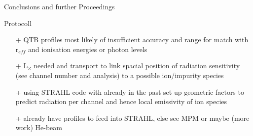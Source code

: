 \documentclass{beamer}
\begin{document}
    \begin{frame}{Conclusions and further Proceedings}
        \begin{block}{Protocoll}
            \begin{itemize}
                \item[+]{%
                    QTB profiles most likely of insufficient accuracy and %
                    range for match with r$_{eff}$ and ionisation energies %
                    or photon levels%
                }%
                \item[+]{%
                    L$_{Z}$ needed and transport to link spacial position of %
                    radiation sensitivity (see channel number and analysis) %
                    to a possible ion/impurity species%
                }
                \item[+]{%
                    using STRAHL code with already in the past set up %
                    geometric factors to predict radiation per channel and %
                    hence local emissivity of ion species%
                }
                \item[+]{%
                    already have profiles to feed into STRAHL, else see %
                    MPM or maybe (more work) He-beam%
                }
            \end{itemize}
        \end{block}
    \end{frame}

    \begin{frame}
    \end{frame}
\end{document}
